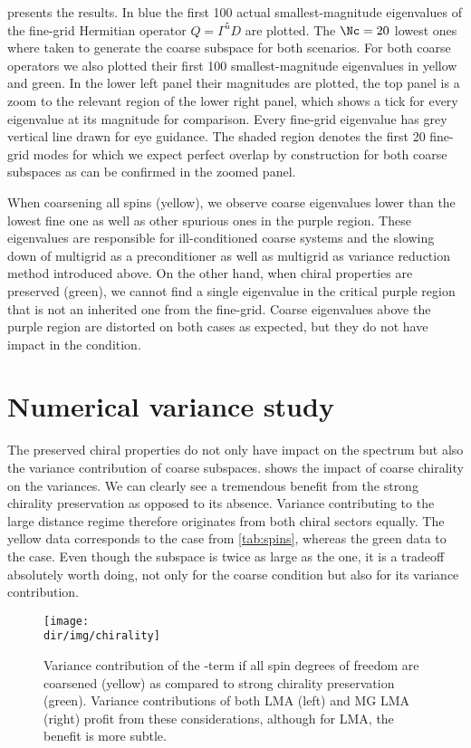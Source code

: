  presents the results.
In blue the first \num{100} actual smallest-magnitude eigenvalues of the fine-grid Hermitian operator $Q = \Gamma^5 D$ are plotted.
The $\Nc=20$ lowest ones where taken to generate the coarse subspace for both scenarios.
For both coarse operators we also plotted their first \num{100} smallest-magnitude eigenvalues in yellow and green.
In the lower left panel their magnitudes are plotted, the top panel is a zoom to the relevant region of the lower right panel, which shows a tick for every eigenvalue at its magnitude for comparison.
Every fine-grid eigenvalue has grey vertical line drawn for eye guidance.
The shaded region denotes the first \num{20} fine-grid modes for which we expect perfect overlap by construction for both coarse subspaces as can be confirmed in the zoomed panel.

When coarsening all spins (yellow), we observe coarse eigenvalues lower than the lowest fine one as well as other spurious ones in the purple region.
These eigenvalues are responsible for ill-conditioned coarse systems and the slowing down of multigrid as a preconditioner as well as multigrid as variance reduction method introduced above.
On the other hand, when chiral properties are preserved (green), we cannot find a single eigenvalue in the critical purple region that is not an inherited one from the fine-grid.
Coarse eigenvalues above the purple region are distorted on both cases as expected, but they do not have impact in the condition.

\section{Numerical variance study}

The preserved chiral properties do not only have impact on the spectrum but also the variance contribution of coarse subspaces.
 shows the impact of coarse chirality on the variances.
We can clearly see a tremendous benefit from the strong chirality preservation as opposed to its absence.
Variance contributing to the large distance regime therefore originates from both chiral sectors equally.
The yellow data corresponds to the  case from \cref{tab:spins}, whereas the green data to the  case.
Even though the  subspace is twice as large as the  one, it is a tradeoff absolutely worth doing, not only for the coarse condition but also for its variance contribution.
\begin{figure}
\centering
\texttt{[image: \\dir/img/chirality]}
\caption{
Variance contribution of the -term if all spin degrees of freedom are coarsened  (yellow) as compared to strong chirality preservation  (green).
Variance contributions of both LMA (left) and MG LMA (right) profit from these considerations, although for LMA, the benefit is more subtle.
\takenfull
}
\label{fig:chirality:variance}
\end{figure}


